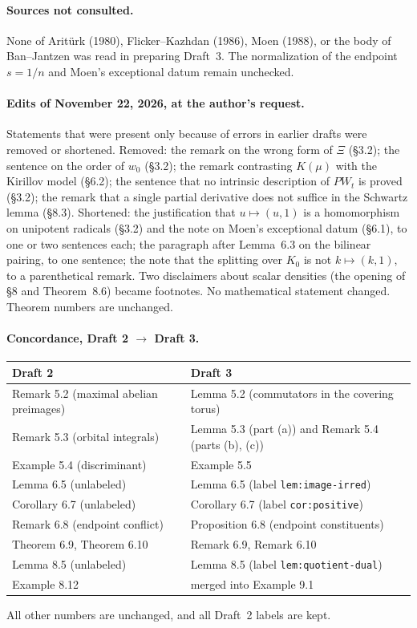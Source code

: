 \documentclass[12pt,letterpaper]{article}
\begin{document}
\paragraph{Sources not consulted.}
None of Arit\"urk (1980), Flicker--Kazhdan (1986), Moen (1988), or the body of Ban--Jantzen was read
in preparing Draft~3.  The normalization of the endpoint $s=1/n$ and Moen's exceptional datum remain
unchecked.

\paragraph{Edits of November 22, 2026, at the author's request.}
Statements that were present only because of errors in earlier drafts were removed or shortened.
Removed: the remark on the wrong form of $\Xi$ (\S3.2); the sentence on the order of $w_0$ (\S3.2); the
remark contrasting $K(\mu)$ with the Kirillov model (\S6.2); the sentence that no intrinsic description of
$PW_t$ is proved (\S3.2); the remark that a single partial derivative does not suffice in the Schwartz
lemma (\S8.3).  Shortened: the justification that $u\mapsto(u,1)$ is a homomorphism on unipotent radicals
(\S3.2) and the note on Moen's exceptional datum (\S6.1), to one or two sentences each; the paragraph after
Lemma~6.3 on the bilinear pairing, to one sentence; the note that the splitting over $K_0$ is not
$k\mapsto(k,1)$, to a parenthetical remark.  Two disclaimers about scalar densities (the opening of \S8 and
Theorem~8.6) became footnotes.  No mathematical statement changed.  Theorem numbers are unchanged.

\paragraph{Concordance, Draft 2 $\to$ Draft 3.}
\begin{center}\small
\begin{tabular}{@{}ll@{}}
\toprule
Draft 2 & Draft 3\\
\midrule
Remark 5.2 (maximal abelian preimages) & Lemma 5.2 (commutators in the covering torus)\\
Remark 5.3 (orbital integrals) & Lemma 5.3 (part (a)) and Remark 5.4 (parts (b), (c))\\
Example 5.4 (discriminant) & Example 5.5\\
Lemma 6.5 (unlabeled) & Lemma 6.5 (label \texttt{lem:image-irred})\\
Corollary 6.7 (unlabeled) & Corollary 6.7 (label \texttt{cor:positive})\\
Remark 6.8 (endpoint conflict) & Proposition 6.8 (endpoint constituents)\\
Theorem 6.9, Theorem 6.10 & Remark 6.9, Remark 6.10\\
Lemma 8.5 (unlabeled) & Lemma 8.5 (label \texttt{lem:quotient-dual})\\
Example 8.12 & merged into Example 9.1\\
\bottomrule
\end{tabular}
\end{center}
All other numbers are unchanged, and all Draft~2 labels are kept.
\end{document}
